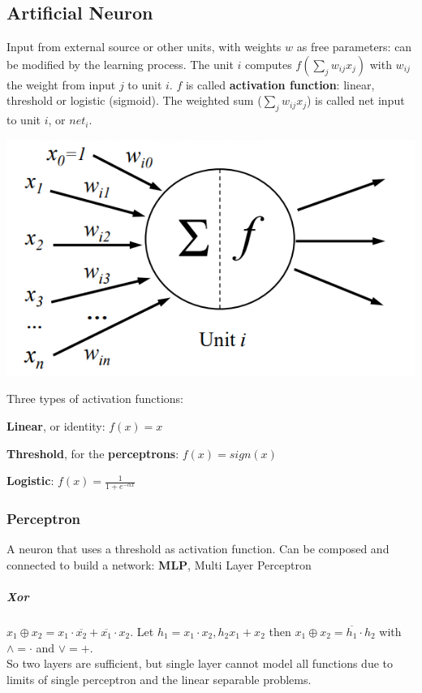 \documentclass[10pt]{report}
\begin{document}
\subsection{Artificial Neuron} Input from external source or other units, with weights $w$ as free parameters: can be modified by the learning process. The unit $i$ computes $f(\sum_j w_{ij}x_j)$ with $w_{ij}$ the weight from input $j$ to unit $i$. $f$ is called \textbf{activation function}: linear, threshold or logistic (sigmoid). The weighted sum ($\sum_j w_{ij}x_j$) is called net input to unit $i$, or $net_i$.
\begin{center}
	\includegraphics[scale=0.75]{6.png}
\end{center}
Three types of activation functions:
\begin{list}{}{}
	\item \textbf{Linear}, or identity: $f(x) = x$
	\item \textbf{Threshold}, for the \textbf{perceptrons}: $f(x) = sign(x)$
	\item \textbf{Logistic}: $f(x) = \frac{1}{1 + e^{-\alpha x}}$
\end{list}
\subsubsection{Perceptron} A neuron that uses a threshold as activation function. Can be composed and connected to build a network: \textbf{MLP}, Multi Layer Perceptron 
\subparagraph{Xor} $x_1 \oplus x_2 = x_1\cdot \overline{x_2} + \overline{x_1}\cdot x_2$. Let $h_1 = x_1\cdot x_2, h_2 x_1 + x_2$ then $x_1 \oplus x_2 = \overline{h_1} \cdot h_2$ with $\wedge = \cdot$ and $\vee = +$.\\
So two layers are sufficient, but single layer cannot model all functions due to limits of single perceptron and the linear separable problems.
\end{document}
